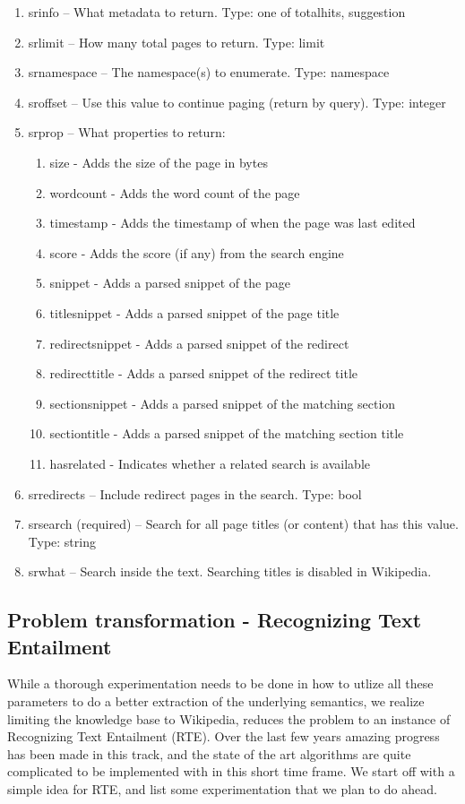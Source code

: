 \documentclass[11pt]{article}
\begin{document}
\begin{enumerate}
\item    srinfo – What metadata to return. Type: one of totalhits, suggestion
\item    srlimit – How many total pages to return. Type: limit
\item    srnamespace – The namespace(s) to enumerate. Type: namespace
\item    sroffset – Use this value to continue paging (return by query). Type: integer
\item    srprop – What properties to return:
\begin{enumerate}
\item    size - Adds the size of the page in bytes
\item    wordcount - Adds the word count of the page
\item    timestamp - Adds the timestamp of when the page was last edited
\item    score - Adds the score (if any) from the search engine
\item    snippet - Adds a parsed snippet of the page
\item    titlesnippet - Adds a parsed snippet of the page title
\item    redirectsnippet - Adds a parsed snippet of the redirect
\item    redirecttitle - Adds a parsed snippet of the redirect title
\item    sectionsnippet - Adds a parsed snippet of the matching section
\item    sectiontitle - Adds a parsed snippet of the matching section title
\item    hasrelated - Indicates whether a related search is available
\end{enumerate}
\item    srredirects – Include redirect pages in the search. Type: bool
\item    srsearch (required) – Search for all page titles (or content) that has this value. Type: string
\item    srwhat – Search inside the text. Searching titles is disabled in Wikipedia.
\end{enumerate}


\subsection{Problem transformation - Recognizing Text Entailment}
While a thorough experimentation needs to be done in how to utlize all these parameters to do a better extraction of the underlying semantics, we realize limiting the knowledge base to Wikipedia, reduces the problem to an instance of Recognizing Text Entailment (RTE). Over the last few years amazing progress has been made in this track, and the state of the art algorithms are quite complicated to be implemented with in this short time frame. We start off with a simple idea for RTE, and list some experimentation that we plan to do ahead. 
\end{document}
